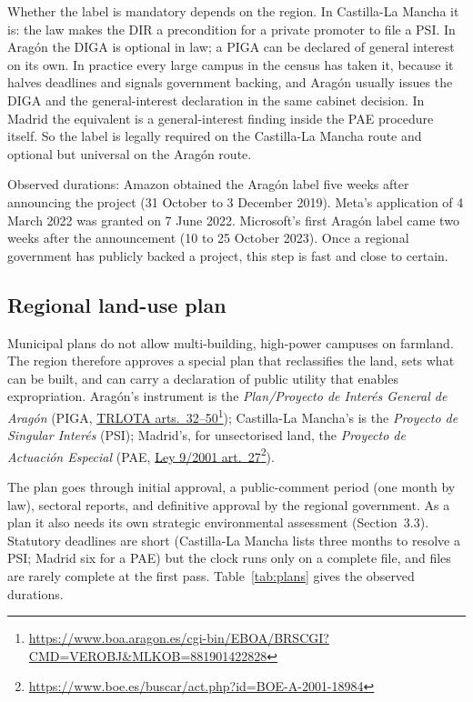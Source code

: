 \documentclass[11pt]{article}
\newcommand{\src}[2]{\href{#1}{#2}\footnote{\url{#1}}}
\begin{document}
Whether the label is mandatory depends on the region. In Castilla-La Mancha it is: the law makes the DIR a precondition for a private promoter to file a PSI. In Aragón the DIGA is optional in law; a PIGA can be declared of general interest on its own. In practice every large campus in the census has taken it, because it halves deadlines and signals government backing, and Aragón usually issues the DIGA and the general-interest declaration in the same cabinet decision. In Madrid the equivalent is a general-interest finding inside the PAE procedure itself. So the label is legally required on the Castilla-La Mancha route and optional but universal on the Aragón route.

Observed durations: Amazon obtained the Aragón label five weeks after announcing the project (31 October to 3 December 2019). Meta's application of 4 March 2022 was granted on 7 June 2022. Microsoft's first Aragón label came two weeks after the announcement (10 to 25 October 2023). Once a regional government has publicly backed a project, this step is fast and close to certain.

\subsection{Regional land-use plan}

Municipal plans do not allow multi-building, high-power campuses on farmland. The region therefore approves a special plan that reclassifies the land, sets what can be built, and can carry a declaration of public utility that enables expropriation. Aragón's instrument is the \emph{Plan/Proyecto de Interés General de Aragón} (PIGA, \src{https://www.boa.aragon.es/cgi-bin/EBOA/BRSCGI?CMD=VEROBJ&MLKOB=881901422828}{TRLOTA arts.~32--50}); Castilla-La Mancha's is the \emph{Proyecto de Singular Interés} (PSI); Madrid's, for unsectorised land, the \emph{Proyecto de Actuación Especial} (PAE, \src{https://www.boe.es/buscar/act.php?id=BOE-A-2001-18984}{Ley 9/2001 art.~27}).

The plan goes through initial approval, a public-comment period (one month by law), sectoral reports, and definitive approval by the regional government. As a plan it also needs its own strategic environmental assessment (Section~3.3). Statutory deadlines are short (Castilla-La Mancha lists three months to resolve a PSI; Madrid six for a PAE) but the clock runs only on a complete file, and files are rarely complete at the first pass. Table~\ref{tab:plans} gives the observed durations.
\end{document}
